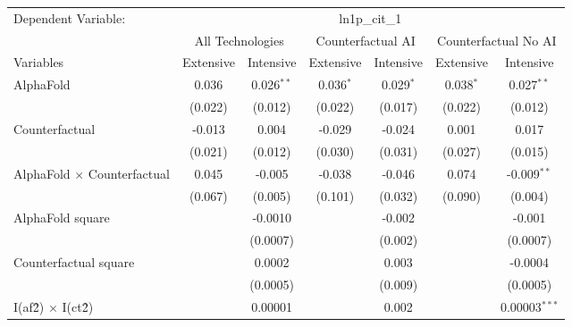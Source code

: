 \begingroup
\centering
\begin{tabular}{lcccccc}
   \tabularnewline \midrule \midrule
   Dependent Variable: & \multicolumn{6}{c}{ln1p\_cit\_1}\\
 & \multicolumn{2}{c}{All Technologies} & \multicolumn{2}{c}{Counterfactual AI} & \multicolumn{2}{c}{Counterfactual No AI} \\
\cmidrule(lr){1-1}\cmidrule(lr){2-3} \cmidrule(lr){4-5} \cmidrule(lr){6-7}
Variables & \multicolumn{1}{c}{Extensive} & \multicolumn{1}{c}{Intensive} & \multicolumn{1}{c}{Extensive} & \multicolumn{1}{c}{Intensive} & \multicolumn{1}{c}{Extensive} & \multicolumn{1}{c}{Intensive} \\
\cmidrule(lr){1-1}\cmidrule(lr){2-2} \cmidrule(lr){3-3} \cmidrule(lr){4-4} \cmidrule(lr){5-5} \cmidrule(lr){6-6} \cmidrule(lr){7-7}
   AlphaFold                          & 0.036   & 0.026$^{**}$ & 0.036$^{*}$ & 0.029$^{*}$ & 0.038$^{*}$ & 0.027$^{**}$\\   
                                      & (0.022) & (0.012)      & (0.022)     & (0.017)     & (0.022)     & (0.012)\\   
   Counterfactual                     & -0.013  & 0.004        & -0.029      & -0.024      & 0.001       & 0.017\\   
                                      & (0.021) & (0.012)      & (0.030)     & (0.031)     & (0.027)     & (0.015)\\   
   AlphaFold $\times$ Counterfactual  & 0.045   & -0.005       & -0.038      & -0.046      & 0.074       & -0.009$^{**}$\\   
                                      & (0.067) & (0.005)      & (0.101)     & (0.032)     & (0.090)     & (0.004)\\   
   AlphaFold square                   &         & -0.0010      &             & -0.002      &             & -0.001\\   
                                      &         & (0.0007)     &             & (0.002)     &             & (0.0007)\\   
   Counterfactual square              &         & 0.0002       &             & 0.003       &             & -0.0004\\   
                                      &         & (0.0005)     &             & (0.009)     &             & (0.0005)\\   
   I(af\^2) $\times$ I(ct\^2)         &         & 0.00001      &             & 0.002       &             & 0.00003$^{***}$\\   

\end{tabular}
